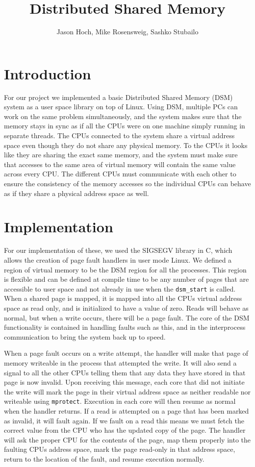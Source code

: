 \documentclass[a4paper,10pt]{article}
\title{Distributed Shared Memory}
\author{Jason Hoch, Mike Rosensweig, Sashko Stubailo}
\begin{document}
\maketitle
\doublespace
\section{Introduction}
For our project we implemented a basic Distributed Shared Memory (DSM) system
as a user
space library on top of Linux.  Using DSM, multiple PCs can work
on the same problem simultaneously, and the system makes sure that the memory
stays in sync as if all the CPUs were on one machine simply running in separate
threads.  The CPUs connected to the system share a virtual address space even
though they do not share any physical memory.  To the CPUs it looks like they
are sharing the exact same memory, and the system must make sure that accesses
to the same area of virtual memory will contain the same value across every
CPU.  The different CPUs must communicate with each other to ensure the
consistency of the memory accesses so the individual CPUs can behave as if they
share a physical address space as well.
\section{Implementation}
For our implementation of these, we used the SIGSEGV library in C, which allows
the creation of page fault handlers in user mode Linux.  We defined a region of
virtual memory to be the DSM region for all the processes.  This region is
flexible and can be defined at compile time to be any number of pages that are
accessible to user space and not already in use when the \verb|dsm_start| is
called.  When a shared page is mapped, it is mapped into all the CPUs virtual
address space as read only, and is initialized to have a value of zero.  Reads
will behave as normal, but when a write occurs, there will be a page fault. 
The core of the DSM functionality is contained in handling faults such as this,
and in the interprocess communication to bring the system back up to speed.

When a page fault occurs on a write attempt, the handler will make that page of
memory writeable in the process that attempted the write.  It will also send a
signal to all the other CPUs telling them that any data they have stored in
that page is now invalid.  Upon receiving this message, each core that did not
initiate the write will mark the page in their virtual address space as neither
readable nor writeable using \verb|mprotect|.  Execution in each core will then
resume as normal when the handler returns.  If a read is attempted on a page
that has been marked as invalid, it will fault again.  If we fault on a read
this means we must fetch the correct value from the CPU who has the updated
copy of the page.  The handler will ask the proper CPU for the contents of the
page, map them properly into the faulting CPUs address space, mark the page
read-only in that address space, return to the location of the fault, and
resume execution normally.
\end{document}
